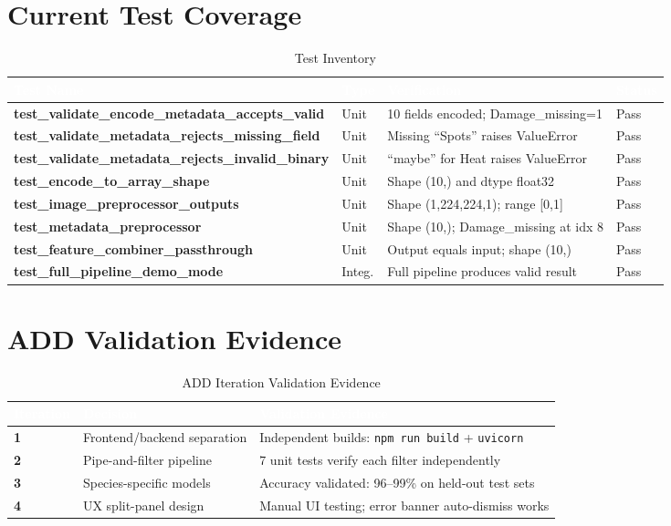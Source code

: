 \documentclass[11pt,a4paper,oneside]{report}
\newcommand{\code}[1]{\texttt{\footnotesize #1}}
\begin{document}
\section{Current Test Coverage}

\begin{table}[H]
\centering\footnotesize
\caption{Test Inventory}
\label{tab:test-inventory}
\begin{tabularx}{\textwidth}{>{\footnotesize\bfseries}p{4.5cm} l X l}
\toprule
\rowcolor{tableheader}
\textcolor{white}{Test Name} & \textcolor{white}{Type} & \textcolor{white}{Verification} & \textcolor{white}{Status} \\
\midrule
test\_validate\_encode\_metadata\_accepts\_valid & Unit & 10 fields encoded; Damage\_missing=1 & Pass \\
test\_validate\_metadata\_rejects\_missing\_field & Unit & Missing ``Spots'' raises ValueError & Pass \\
test\_validate\_metadata\_rejects\_invalid\_binary & Unit & ``maybe'' for Heat raises ValueError & Pass \\
test\_encode\_to\_array\_shape & Unit & Shape (10,) and dtype float32 & Pass \\
test\_image\_preprocessor\_outputs & Unit & Shape (1,224,224,1); range [0,1] & Pass \\
test\_metadata\_preprocessor & Unit & Shape (10,); Damage\_missing at idx 8 & Pass \\
test\_feature\_combiner\_passthrough & Unit & Output equals input; shape (10,) & Pass \\
test\_full\_pipeline\_demo\_mode & Integ. & Full pipeline produces valid result & Pass \\
\bottomrule
\end{tabularx}
\end{table}

\section{ADD Validation Evidence}

\begin{table}[H]
\centering\footnotesize
\caption{ADD Iteration Validation Evidence}
\label{tab:add-validation}
\begin{tabularx}{\textwidth}{>{\bfseries}l X X}
\toprule
\rowcolor{tableheader}
\textcolor{white}{Iteration} & \textcolor{white}{Decision} & \textcolor{white}{Validation Evidence} \\
\midrule
1 & Frontend/backend separation & Independent builds: \code{npm run build} + \code{uvicorn} \\
2 & Pipe-and-filter pipeline & 7 unit tests verify each filter independently \\
3 & Species-specific models & Accuracy validated: 96--99\% on held-out test sets \\
4 & UX split-panel design & Manual UI testing; error banner auto-dismiss works \\
\bottomrule
\end{tabularx}
\end{table}
\end{document}

